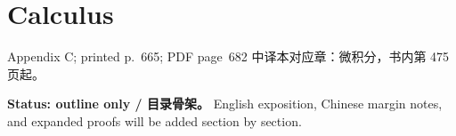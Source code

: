\chapter{Calculus}
\label{app:calculus}

\PDESource
  {Appendix C; printed p.~665; PDF page~682}
  {中译本对应章：微积分，书内第 475 页起。}

\noindent\textbf{Status: outline only / 目录骨架。}
English exposition, Chinese margin notes, and expanded proofs will be added section by section.










